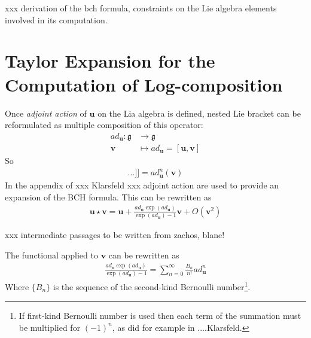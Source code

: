 \noindent
xxx derivation of the bch formula, constraints on the Lie algebra elements involved in its computation.

\section{Taylor Expansion for the Computation of Log-composition}



Once \emph{adjoint action} of $\mathbf{u}$ on the Lia algebra is defined, nested Lie bracket can be reformulated as multiple composition of this operator:
\begin{align*}
	ad_{\mathbf{u}} : \mathfrak{g}  & \longrightarrow \mathfrak{g}  
	\\
	\mathbf{v} &\longmapsto ad_{\mathbf{u}}   =  [\mathbf{u}, \mathbf{v}]
\end{align*}
So
\begin{align*}
	[  \underbrace{   \mathbf{u},[\mathbf{u},... [\mathbf{u}}_{\text{n-times}},\mathbf{v}]...]] =  ad_{\mathbf{u}}^{n}(\mathbf{v})
\end{align*}
In the appendix of xxx Klarsfeld xxx adjoint action are used to provide an expansion of the BCH formula. This can be rewritten as
\begin{align*}
	\mathbf{u}\star \mathbf{v}  = \mathbf{u} + \frac{ ad_{\mathbf{u}} \exp(ad_{\mathbf{u}}) }{ \exp(ad_{\mathbf{u}}) - 1 }  \mathbf{v} + O({\mathbf{v}}^2)
\end{align*}

\noindent
xxx intermediate passages to be written from zachos, blane!

The functional applied to $\mathbf{v}$ can be rewritten as
\begin{align*}
	\frac{ ad_{\mathbf{u}} \exp(ad_{\mathbf{u}}) }{ \exp(ad_{\mathbf{u}}) - 1 }  = \sum_{n=0}^{\infty} \frac{B_{n}}{n!} ad_{\mathbf{u}}^{n} 
\end{align*}
Where $\lbrace B_{n} \rbrace $ is the sequence of the second-kind Bernoulli number\footnote{If first-kind Bernoulli number is used then each term of the summation must be multiplied for $(-1)^{n}$, as did for example in ....Klarsfeld.}.

